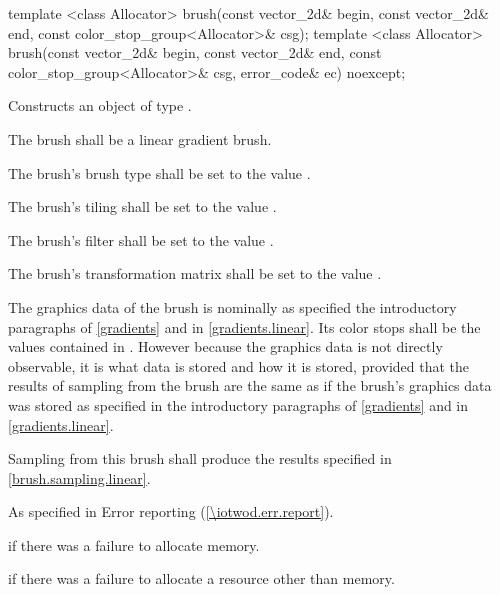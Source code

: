 \begin{itemdecl}
template <class Allocator>
brush(const vector_2d& begin, const vector_2d& end,
  const color_stop_group<Allocator>& csg);
template <class Allocator>
brush(const vector_2d& begin, const vector_2d& end,
  const color_stop_group<Allocator>& csg, error_code& ec) noexcept;
\end{itemdecl}
\begin{itemdescr}
\pnum
\effects
Constructs an object of type .

\pnum
The brush shall be a linear gradient brush.

\pnum
The brush's brush type shall be set to the value .

\pnum
The brush's tiling shall be set to the value .

\pnum
The brush's filter shall be set to the value .

\pnum
The brush's transformation matrix shall be set to the value .

\pnum
The graphics data of the brush is nominally as specified the introductory paragraphs of \ref{gradients} and in \ref{gradients.linear}. Its color stops shall be the values contained in . However because the graphics data is not directly observable, it is \unspecnorm what data is stored and how it is stored, provided that the results of sampling from the brush are the same as if the brush's graphics data was stored as specified in the introductory paragraphs of \ref{gradients} and in \ref{gradients.linear}.

\pnum
\remarks
Sampling from this brush shall produce the results specified in \ref{brush.sampling.linear}.

\pnum
\throws
As specified in Error reporting (\ref{\iotwod.err.report}).

\pnum
\errors
{} if there was a failure to allocate memory.

 if there was a failure to allocate a resource other than memory.
\end{itemdescr}

